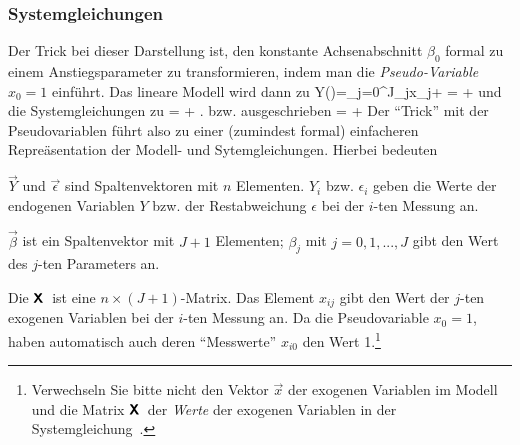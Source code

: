 \subsubsection{Systemgleichungen}
Der Trick bei dieser Darstellung ist, den
 konstante Achsenabschnitt $\beta_0$ formal zu
einem Anstiegsparameter zu transformieren, indem
 man die \emph{Pseudo-Variable $x_0=1$}
einf\"uhrt. Das lineare Modell wird dann zu
\be
\label{modLinMat}
Y()=\sum_{j=0}^J\beta_jx_j+\epsilon
 = \vec{\beta}\tr\cdot {}+\epsilon
\ee
und die Systemgleichungen zu
{=\cdot \vec{\beta} + \vec{\epsilon}.
}
bzw. ausgeschrieben
\be
\label{sysLinMatDetail}
 =
\cdot
{}
 +
\ee
Der ``Trick'' mit der Pseudovariablen f\"uhrt also zu einer (zumindest
formal) einfacheren Repre\"asentation der Modell- und
Sytemgleichungen. Hierbei bedeuten
\bi
\item $\vec{Y}$ und $\vec{\epsilon}$ sind Spaltenvektoren mit $n$
Elementen. $Y_i$ bzw. $\epsilon_i$ geben die Werte
der endogenen Variablen $Y$ bzw. der Restabweichung $\epsilon$ 
bei der $i$-ten Messung an.
\item $\vec{\beta}$ ist ein Spaltenvektor mit $J+1$ Elementen;
$\beta_j$ mit $j=0,1, ..., J$ gibt
den Wert des $j$-ten Parameters an.
\item Die  $\textbf{\textsf{X}}\,$ ist eine $n\times (J+1)$-Matrix.
 Das Element $x_{ij}$
gibt den Wert der $j$-ten exogenen Variablen bei der $i$-ten Messung
an. Da die Pseudovariable $x_0=1$, haben automatisch auch deren
``Messwerte'' $x_{i0}$ den Wert 1.\footnote{Verwechseln Sie bitte nicht den Vektor
$\vec{x}$ der exogenen Variablen im Modell~ und die
Matrix $\textbf{\textsf{X}}\,$ der \textit{Werte} der exogenen Variablen in der
Systemgleichung~.}
\ei



